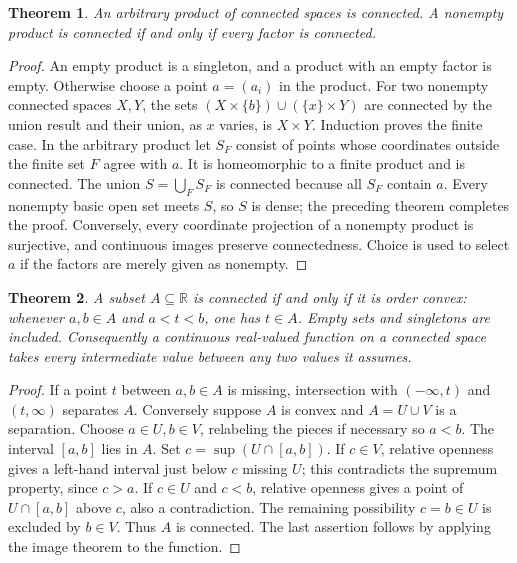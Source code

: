 \documentclass[11pt,oneside,openany]{book}
\newtheorem{theorem}{Theorem}[chapter]
\theoremstyle{definition}
\theoremstyle{remark}
\newcommand{\R}{\mathbb R}\newcommand{\C}{\mathbb C}
\begin{document}
\begin{theorem}\label{d10:06:product}
An arbitrary product of connected spaces is connected. A nonempty product is connected if and only if every factor is connected.
\end{theorem}
\begin{proof}
An empty product is a singleton, and a product with an empty factor is empty. Otherwise choose a point $a=(a_i)$ in the product. For two nonempty connected spaces $X,Y$, the sets $(X\times\{b\})\cup(\{x\}\times Y)$ are connected by the union result and their union, as $x$ varies, is $X\times Y$. Induction proves the finite case. In the arbitrary product let $S_F$ consist of points whose coordinates outside the finite set $F$ agree with $a$. It is homeomorphic to a finite product and is connected. The union $S=\bigcup_F S_F$ is connected because all $S_F$ contain $a$. Every nonempty basic open set meets $S$, so $S$ is dense; the preceding theorem completes the proof. Conversely, every coordinate projection of a nonempty product is surjective, and continuous images preserve connectedness. Choice is used to select $a$ if the factors are merely given as nonempty.
\end{proof}

\begin{theorem}\label{d10:06:intervals}
A subset $A\subseteq\R$ is connected if and only if it is order convex: whenever $a,b\in A$ and $a<t<b$, one has $t\in A$. Empty sets and singletons are included. Consequently a continuous real-valued function on a connected space takes every intermediate value between any two values it assumes.
\end{theorem}
\begin{proof}
If a point $t$ between $a,b\in A$ is missing, intersection with $(-\infty,t)$ and $(t,\infty)$ separates $A$. Conversely suppose $A$ is convex and $A=U\cup V$ is a separation. Choose $a\in U,b\in V$, relabeling the pieces if necessary so $a<b$. The interval $[a,b]$ lies in $A$. Set $c=\sup(U\cap[a,b])$. If $c\in V$, relative openness gives a left-hand interval just below $c$ missing $U$; this contradicts the supremum property, since $c>a$. If $c\in U$ and $c<b$, relative openness gives a point of $U\cap[a,b]$ above $c$, also a contradiction. The remaining possibility $c=b\in U$ is excluded by $b\in V$. Thus $A$ is connected. The last assertion follows by applying the image theorem to the function.
\end{proof}
\end{document}

